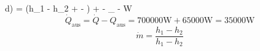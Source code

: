 d)   =  (h_1 - h_2 +  - ) +  - _{} - W
\[
\dot{Q}_{\text{aus}} = \dot{Q} - Q_{\text{aus}} = 700000 \text{W} + 65000 \text{W} = 35000 \text{W}
\]
\[
\dot{m} = \frac{h_1 - h_2}{h_1 - h_2}
\]
